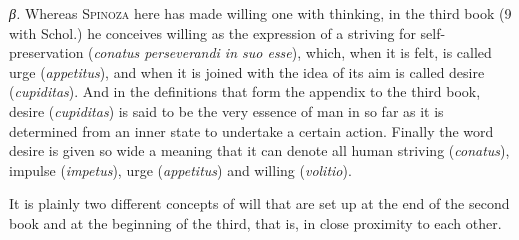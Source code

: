 \documentclass[12pt]{article}
\begin{document}
\textit{β.} Whereas \textsc{Spinoza} here has made willing one with thinking, in the third
book (9 with Schol.) he conceives willing as the expression of a striving for
self-preservation (\textit{conatus perseverandi in suo esse}), which, when it is felt, is
called urge (\textit{appetitus}), and when it is joined with the idea of its aim is called
desire (\textit{cupiditas}). And in the definitions that form the appendix to the third book,
desire (\textit{cupiditas}) is said to be the very essence of man in so far as it is determined
from an inner state to undertake a certain action. Finally the word desire is given so wide a
meaning that it can denote all human striving (\textit{conatus}), impulse (\textit{impetus}),
urge (\textit{appetitus}) and willing (\textit{volitio}).

It is plainly two different concepts of will that are set up at the end of the second book and
at the beginning of the third, that is, in close proximity to each other.
\end{document}
